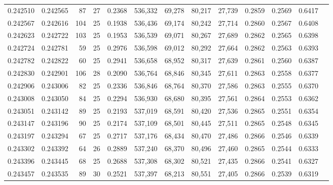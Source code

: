 \begin{tabular}{rrrrrrrrrrrrr}
0.242510 & 0.242565 &  87 &  27 &                                     0.2368 & 536,332 &  69,278 &  80,217 &  27,739 & 0.2859 & 0.2569 & 0.6417 \\
0.242567 & 0.242616 & 104 &  25 &                                     0.1938 & 536,436 &  69,174 &  80,242 &  27,714 & 0.2860 & 0.2567 & 0.6408 \\
0.242623 & 0.242722 & 103 &  25 &                                     0.1953 & 536,539 &  69,071 &  80,267 &  27,689 & 0.2862 & 0.2565 & 0.6398 \\
0.242724 & 0.242781 &  59 &  25 &                                     0.2976 & 536,598 &  69,012 &  80,292 &  27,664 & 0.2862 & 0.2563 & 0.6393 \\
0.242782 & 0.242822 &  60 &  25 &                                     0.2941 & 536,658 &  68,952 &  80,317 &  27,639 & 0.2861 & 0.2560 & 0.6387 \\
0.242830 & 0.242901 & 106 &  28 &                                     0.2090 & 536,764 &  68,846 &  80,345 &  27,611 & 0.2863 & 0.2558 & 0.6377 \\
0.242906 & 0.243006 &  82 &  25 &                                     0.2336 & 536,846 &  68,764 &  80,370 &  27,586 & 0.2863 & 0.2555 & 0.6370 \\
0.243008 & 0.243050 &  84 &  25 &                                     0.2294 & 536,930 &  68,680 &  80,395 &  27,561 & 0.2864 & 0.2553 & 0.6362 \\
0.243051 & 0.243142 &  89 &  25 &                                     0.2193 & 537,019 &  68,591 &  80,420 &  27,536 & 0.2865 & 0.2551 & 0.6354 \\
0.243147 & 0.243196 &  90 &  25 &                                     0.2174 & 537,109 &  68,501 &  80,445 &  27,511 & 0.2865 & 0.2548 & 0.6345 \\
0.243197 & 0.243294 &  67 &  25 &                                     0.2717 & 537,176 &  68,434 &  80,470 &  27,486 & 0.2866 & 0.2546 & 0.6339 \\
0.243302 & 0.243392 &  64 &  26 &                                     0.2889 & 537,240 &  68,370 &  80,496 &  27,460 & 0.2865 & 0.2544 & 0.6333 \\
0.243396 & 0.243445 &  68 &  25 &                                     0.2688 & 537,308 &  68,302 &  80,521 &  27,435 & 0.2866 & 0.2541 & 0.6327 \\
0.243457 & 0.243535 &  89 &  30 &                                     0.2521 & 537,397 &  68,213 &  80,551 &  27,405 & 0.2866 & 0.2539 & 0.6319 \\

\end{tabular}
